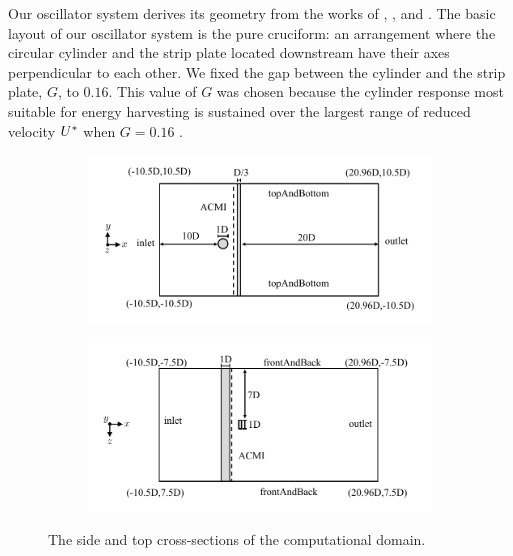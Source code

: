 \documentclass[oneside]{utmthesis}
\begin{document}
Our oscillator system derives its geometry from the works of \citet{Nguyen2012}, \citet{Koide2013}, and \citet{Koide2017}. The basic layout of our oscillator system is the pure cruciform: an arrangement where the circular cylinder and the strip plate located downstream have their axes perpendicular to each other. We fixed the gap between the cylinder and the strip plate, $G$, to $0.16$. This value of $G$ was chosen because the cylinder response most suitable for energy harvesting is sustained over the largest range of reduced velocity $U^{*}$ when $G = 0.16$ \citep{Koide2013}.

\begin{figure}
  \centering
  \begin{subfigure}[h]{1\textwidth}
    \includegraphics[width=\textwidth]{figs/problemGeometrySide}
    \caption{}
    \label{fig:probGeoSide}
  \end{subfigure}

  \begin{subfigure}[h]{0.98\textwidth}
    \includegraphics[width=\textwidth]{figs/problemGeometryTop}
    \caption{}
    \label{fig:probGeoTop}
  \end{subfigure}

  \caption{The side and top cross-sections of the computational domain.} \label{fig:problemGeometry}
\end{figure}
\end{document}
